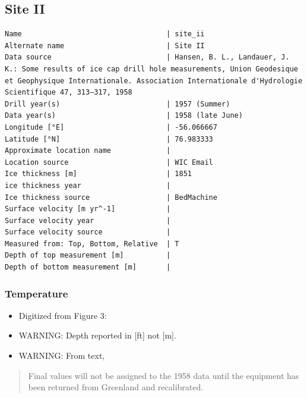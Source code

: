 \documentclass[article,a4paper,times,11pt,twoside]{article}
\begin{document}
\subsection{Site II}
\label{sec:org82c761f}
\begin{verbatim}
Name                                  | site_ii
Alternate name                        | Site II
Data source                           | Hansen, B. L., Landauer, J. K.: Some results of ice cap drill hole measurements, Union Geodesique et Geophysique Internationale. Association Internationale d'Hydrologie Scientifique 47, 313–317, 1958 
Drill year(s)                         | 1957 (Summer)
Data year(s)                          | 1958 (late June)
Longitude [°E]                        | -56.066667
Latitude [°N]                         | 76.983333
Approximate location name             | 
Location source                       | WIC Email
Ice thickness [m]                     | 1851
ice thickness year                    | 
Ice thickness source                  | BedMachine
Surface velocity [m yr^-1]            | 
Surface velocity year                 | 
Surface velocity source               | 
Measured from: Top, Bottom, Relative  | T
Depth of top measurement [m]          | 
Depth of bottom measurement [m]       | 
\end{verbatim}

\subsubsection{Temperature}
\label{sec:orgb045538}

\begin{itemize}
\item Digitized from \textcite{hansen_1958} Figure 3:
\item WARNING: Depth reported in [ft] not [m].
\item WARNING: From text,
\end{itemize}

\begin{quote}
Final values will not be assigned to the 1958 data until the equipment
has been returned from Greenland and recalibrated.
\end{quote}
\end{document}
